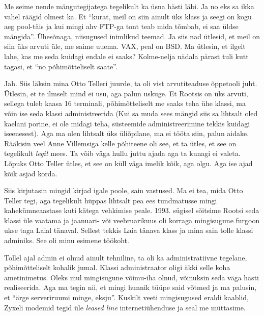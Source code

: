 Me seime nende mängutegijatega tegelikult ka üsna hästi läbi. Ja no eks sa ikka 
vahel räägid olmest ka. Et \enquote{kurat, meil on siin ainult üks klass ja 
seegi  on kogu aeg pool-täis ja kui mingi ahv FTP-ga tont teab mida tõmbab, ei 
saa üldse mängida}. Ühesõnaga, niisugused inimlikud teemad. Ja siis nad ütlesid, 
et meil on siin üks arvuti üle, me saime uuema. VAX, peal on 
BSD. Ma ütlesin, et ilgelt lahe, kas me seda kuidagi endale ei 
saaks? Kolme-nelja nädala pärast tuli kutt tagasi, et \enquote{no 
põhimõtteliselt saate}. 

 \label{sisu!jaanus_liivi_tn}

Jah. Siis läksin mina Otto Telleri juurde, ta oli vist 
arvutiteaduse õppetooli juht. Ütlesin, et te ilmselt mind ei usu, aga palun 
uskuge. Et Rootsis on üks arvuti, sellega tuleb kaasa 16 terminali, 
põhimõtteliselt me saaks teha ühe klassi, ma võin ise seda klassi 
administreerida (Kui sa muda sees mängid siis sa lihtsalt oled kaelani porine, 
ei ole midagi teha, süsteemide administreerimine tekkis  kuidagi iseenesest). 
Aga ma olen lihtsalt üks üliõpilane, ma ei tööta siin, palun aidake. Rääkisin 
veel Anne Villemsiga kelle põhiteene oli 
see, et ta ütles, et see on tegelikult \emph{legit} mees. Ta võib väga hullu 
juttu ajada aga ta kunagi ei valeta. Lõpuks Otto Teller ütles, et see on küll 
väga imelik kõik, aga olgu. Aga ise ajad kõik asjad korda.

Siis kirjutasin mingid kirjad igale poole, sain vastused. Ma ei tea, mida Otto 
Teller tegi, aga tegelikult hüppas lihtsalt pea ees tundmatusse mingi kahekümneaastase 
kuti kätega vehkimise peale. 1993. sügisel sõitsime Rootsi seda klassi 
üle vaatama ja  jaanuari- või veebruarikuus oli korraga mingisugune furgoon 
ukse taga Laial tänaval. Sellest tekkis Laia tänava klass ja mina sain tolle klassi adminiks. See oli minu 
esimene töökoht.

Tollel ajal admin ei olnud ainult  tehniline,  ta oli ka  
administratiivne tegelane, põhimõtteliselt kohalik jumal. Klassi administraator 
oligi äkki selle koha ametinimetus. Oleks mul mingisugune võimu-iha olnud, 
võinuksin seda väga hästi realiseerida. Aga ma tegin nii, et mingi hunnik tüüpe 
said võtmed ja ma palusin, et \enquote{ärge serveriruumi minge, eksju}. Kuskilt 
veeti mingisugused eraldi kaablid, Zyxeli modemid tegid üle \emph{leased line} 
internetiühenduse  ja seal me müttasime.

